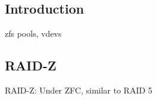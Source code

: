 
\subsection{Introduction}

zfs pools, vdevs



\subsection{RAID-Z}

RAID-Z: Under ZFC, similar to RAID 5

